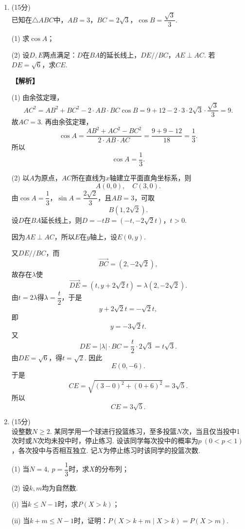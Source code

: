 \documentclass[12pt,a4paper]{article}
\providecommand{\varparallel}{\mathrel{/\!/}}
\begin{document}
\begin{enumerate}[leftmargin=*,label=\arabic*.,resume,itemsep=1.2ex]
		平面$BCC_1B_1$为$x=0$，直线$DE$上各点$x$坐标均为$1$，故直线到该平面的距离为
		\[
		\boxed{1}.
		\]
		
		\item (15分)\\
		已知在$\triangle ABC$中，$AB=3$，$BC=2\sqrt3$，$\cos B=\dfrac{\sqrt3}{3}$.
		
		(1) 求$\cos A$；
		
		(2) 设$D,E$两点满足：$D$在$BA$的延长线上，$DE\varparallel BC$，$AE\perp AC$. 若$DE=\sqrt6$，求$CE$.
		
		\textbf{【解析】}
		
		(1) 由余弦定理，
		\[
		AC^2=AB^2+BC^2-2\cdot AB\cdot BC\cos B
		=9+12-2\cdot3\cdot2\sqrt3\cdot\frac{\sqrt3}{3}=9.
		\]
		故$AC=3$. 再由余弦定理，
		\[
		\cos A=\frac{AB^2+AC^2-BC^2}{2\cdot AB\cdot AC}
		=\frac{9+9-12}{18}=\frac13.
		\]
		所以
		\[
		\boxed{\cos A=\frac13}.
		\]
		
		(2) 以$A$为原点，$AC$所在直线为$x$轴建立平面直角坐标系，则
		\[
		A(0,0),\quad C(3,0).
		\]
		由$\cos A=\dfrac13$，$\sin A=\dfrac{2\sqrt2}{3}$，且$AB=3$，可取
		\[
		B(1,2\sqrt2).
		\]
		设$D$在$BA$延长线上，则$D=-tB=(-t,-2\sqrt2t)$，$t>0$.
		
		因为$AE\perp AC$，所以$E$在$y$轴上，设$E(0,y)$.
		
		又$DE\varparallel BC$，而
		\[
		\overrightarrow{BC}=(2,-2\sqrt2),
		\]
		故存在$\lambda$使
		\[
		\overrightarrow{DE}=(t,y+2\sqrt2t)=\lambda(2,-2\sqrt2).
		\]
		由$t=2\lambda$得$\lambda=\dfrac t2$，于是
		\[
		y+2\sqrt2t=-\sqrt2t,
		\]
		即
		\[
		y=-3\sqrt2t.
		\]
		又
		\[
		DE=|\lambda|\cdot BC=\frac t2\cdot2\sqrt3=t\sqrt3.
		\]
		由$DE=\sqrt6$，得$t=\sqrt2$. 因此
		\[
		E(0,-6).
		\]
		于是
		\[
		CE=\sqrt{(3-0)^2+(0+6)^2}=3\sqrt5.
		\]
		所以
		\[
		\boxed{CE=3\sqrt5}.
		\]
		
		\item (15分)\\
		设整数$N\ge2$. 某同学用一个球进行投篮练习，至多投篮$N$次，当且仅当投中1次时或$N$次均未投中时，停止练习. 设该同学每次投中的概率为$p\ (0<p<1)$，各次投中与否相互独立. 记$X$为停止练习时该同学的投篮次数.
		
		(1) 当$N=4,\ p=\dfrac13$时，求$X$的分布列；
		
		(2) 设$k,m$均为自然数.
		
		\hspace*{2em}(i) 当$k\le N-1$时，求$P(X>k)$；
		
		\hspace*{2em}(ii) 当$k+m\le N-1$时，证明：$P(X>k+m\mid X>k)=P(X>m)$.
		

\end{enumerate}
\end{document}
